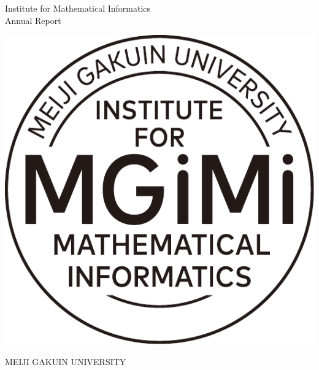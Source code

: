 \documentclass[12pt]{article}
\begin{document}
\setcounter{page}{0}
\thispagestyle{empty}

\vspace*{2cm}

\begin{center}
\Huge{\sffamily Institute for Mathematical Informatics}\\
\vspace{1.5cm}
\Huge{\sffamily Annual Report}\\
\vspace{0.5cm}
\Huge{}

\vfill
\includegraphics[scale=0.75]{circle_logo.pdf}
\vfill

\Huge{M}\Large{EIJI}
\Huge{G}\Large{AKUIN}
\Huge{U}\Large{NIVERSITY}
\end{center}

\vspace{1cm}

\newpage

\pagestyle{fancy}
\fancyhead{}
\fancyfoot{}
\fancyfoot[L]{\TheAuthor}
\fancyfoot[R]{\footnotesize \thepage}
\renewcommand{\footrulewidth}{1pt}
\renewcommand{\headrulewidth}{1pt}

%
%


%
%


%
%

 
\end{document}

